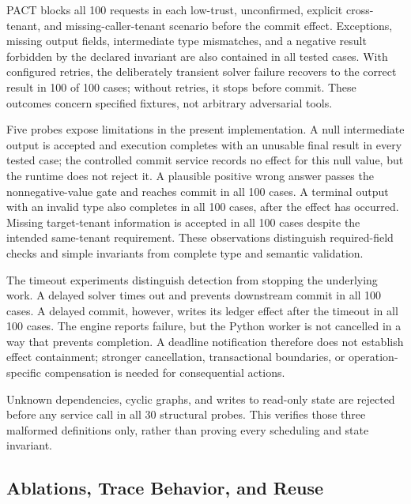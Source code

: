 \documentclass[10pt,twocolumn,a4paper]{article}
\begin{document}
PACT blocks all 100 requests in each low-trust, unconfirmed, explicit cross-tenant, and missing-caller-tenant scenario before the commit effect. Exceptions, missing output fields, intermediate type mismatches, and a negative result forbidden by the declared invariant are also contained in all tested cases. With configured retries, the deliberately transient solver failure recovers to the correct result in 100 of 100 cases; without retries, it stops before commit. These outcomes concern specified fixtures, not arbitrary adversarial tools.


Five probes expose limitations in the present implementation. A null intermediate output is accepted and execution completes with an unusable final result in every tested case; the controlled commit service records no effect for this null value, but the runtime does not reject it. A plausible positive wrong answer passes the nonnegative-value gate and reaches commit in all 100 cases. A terminal output with an invalid type also completes in all 100 cases, after the effect has occurred. Missing target-tenant information is accepted in all 100 cases despite the intended same-tenant requirement. These observations distinguish required-field checks and simple invariants from complete type and semantic validation.


The timeout experiments distinguish detection from stopping the underlying work. A delayed solver times out and prevents downstream commit in all 100 cases. A delayed commit, however, writes its ledger effect after the timeout in all 100 cases. The engine reports failure, but the Python worker is not cancelled in a way that prevents completion. A deadline notification therefore does not establish effect containment; stronger cancellation, transactional boundaries, or operation-specific compensation is needed for consequential actions.


Unknown dependencies, cyclic graphs, and writes to read-only state are rejected before any service call in all 30 structural probes. This verifies those three malformed definitions only, rather than proving every scheduling and state invariant.


\subsection{Ablations, Trace Behavior, and Reuse}
\end{document}
